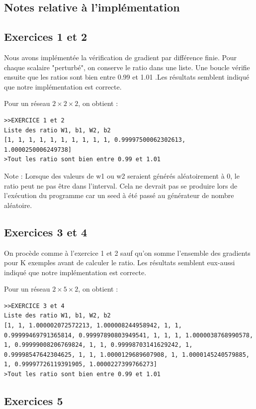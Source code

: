 \documentclass[a4paper,11pt]{article}
\begin{document}
\subsection{Notes relative à l'implémentation}

\subsection{Exercices 1 et 2}

Nous avons implémentée la vérification de gradient par différence finie. Pour chaque scalaire "perturbé", on conserve le ratio dans une liste. Une boucle vérifie ensuite que les ratios sont bien entre 0.99 et 1.01 .Les résultats semblent indiqué que notre implémentation est correcte.

Pour un réseau $ 2 \times 2 \times 2 $, on obtient :
\begin{verbatim}
>>EXERCICE 1 et 2
Liste des ratio W1, b1, W2, b2
[1, 1, 1, 1, 1, 1, 1, 1, 1, 1, 0.99997500062302613, 1.0000250006249738]
>Tout les ratio sont bien entre 0.99 et 1.01
\end{verbatim}

Note : Lorsque des valeurs de w1 ou w2 seraient générés aléatoirement à 0, le ratio peut ne pas être dans l'interval. Cela ne devrait pas se produire lors de l'exécution du programme car un seed à été passé au générateur de nombre aléatoire.

\subsection{Exercices 3 et 4	}

On procède comme à l'exercice 1 et 2 sauf qu'on somme l'ensemble des gradients pour K exemples avant de calculer le ratio. Les résultats semblent eux-aussi indiqué que notre implémentation est correcte.

Pour un réseau $ 2 \times 5 \times 2 $, on obtient :
\begin{verbatim}
>>EXERCICE 3 et 4
Liste des ratio W1, b1, W2, b2
[1, 1, 1.000002072572213, 1.000008244958942, 1, 1, 0.99999469791365814, 0.99997890803949541, 1, 1, 1, 1.0000038768990578, 1, 0.99999008206769824, 1, 1, 0.99998703141629242, 1, 0.99998547642304625, 1, 1, 1.0000129689607908, 1, 1.0000145240579885, 1, 0.99997726119391905, 1.0000227399766273]
>Tout les ratio sont bien entre 0.99 et 1.01
\end{verbatim}

\subsection{Exercices 5}
\end{document}
